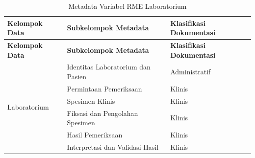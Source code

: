 \documentclass[bahasa, 12pt, a4paper, onecolumn, oneside, final]{report}
\begin{document}
\begin{longtable}{|p{4cm}|p{5.2cm}|p{3.2cm}|}
	\caption{Metadata Variabel RME Laboratorium}
	\label{tab:metadata-rme-laboratorium}                             \\
	\hline
	\textbf{Kelompok Data}        &
	\textbf{Subkelompok Metadata} &
	\textbf{Klasifikasi Dokumentasi}                                  \\ \hline
	\endfirsthead

	\hline
	\textbf{Kelompok Data}        &
	\textbf{Subkelompok Metadata} &
	\textbf{Klasifikasi Dokumentasi}                                  \\ \hline
	\endhead

	\multirow{7}{4cm}{Laboratorium}
	                              & Identitas Laboratorium dan Pasien
	                              & Administratif                     \\ \cline{2-3}

	                              & Permintaan Pemeriksaan
	                              & Klinis                            \\ \cline{2-3}

	                              & Spesimen Klinis
	                              & Klinis                            \\ \cline{2-3}

	                              & Fiksasi dan Pengolahan Spesimen
	                              & Klinis                            \\ \cline{2-3}

	                              & Hasil Pemeriksaan
	                              & Klinis                            \\ \cline{2-3}

	                              & Interpretasi dan Validasi Hasil
	                              & Klinis                            \\ \hline
\end{longtable}
\end{document}
